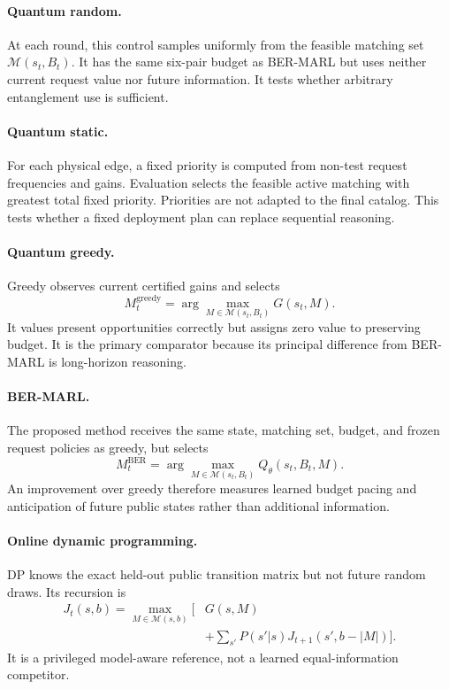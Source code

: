 \documentclass[10pt,twocolumn]{article}
\newcommand{\method}{\textsc{BER-MARL}}
\begin{document}
\paragraph{Quantum random.}
At each round, this control samples uniformly from the feasible matching set $\mathcal{M}(s_t,B_t)$. It has the same six-pair budget as \method{} but uses neither current request value nor future information. It tests whether arbitrary entanglement use is sufficient.

\paragraph{Quantum static.}
For each physical edge, a fixed priority is computed from non-test request frequencies and gains. Evaluation selects the feasible active matching with greatest total fixed priority. Priorities are not adapted to the final catalog. This tests whether a fixed deployment plan can replace sequential reasoning.

\paragraph{Quantum greedy.}
Greedy observes current certified gains and selects
\begin{equation}
M_t^{\mathrm{greedy}}=\arg\max_{M\in\mathcal{M}(s_t,B_t)}G(s_t,M).
\label{eq:greedy}
\end{equation}
It values present opportunities correctly but assigns zero value to preserving budget. It is the primary comparator because its principal difference from \method{} is long-horizon reasoning.

\paragraph{BER-MARL.}
The proposed method receives the same state, matching set, budget, and frozen request policies as greedy, but selects
\begin{equation}
M_t^{\mathrm{BER}}=\arg\max_{M\in\mathcal{M}(s_t,B_t)}Q_\theta(s_t,B_t,M).
\end{equation}
An improvement over greedy therefore measures learned budget pacing and anticipation of future public states rather than additional information.

\paragraph{Online dynamic programming.}
DP knows the exact held-out public transition matrix but not future random draws. Its recursion is
\begin{equation}
\begin{aligned}
J_t(s,b)=\max_{M\in\mathcal{M}(s,b)}\bigg[&G(s,M)\\
&+\sum_{s'}P(s'|s)J_{t+1}(s',b-|M|)\bigg].
\end{aligned}
\label{eq:dp}
\end{equation}
It is a privileged model-aware reference, not a learned equal-information competitor.
\end{document}
